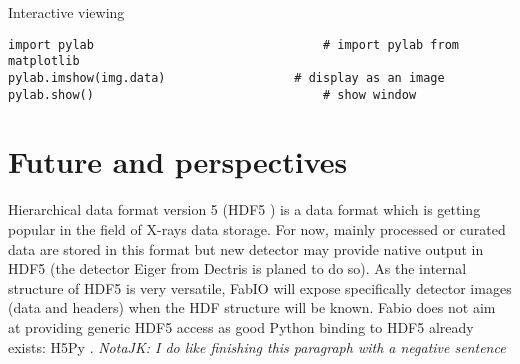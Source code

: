 \documentclass{iucr}
\begin{document}
Interactive viewing

\begin{verbatim}
import pylab								# import pylab from matplotlib
pylab.imshow(img.data)					# display as an image
pylab.show()								# show window
\end{verbatim}





\section{Future and perspectives}

Hierarchical data format version 5 (HDF5 \cite{hdf5}) is a data format which is
getting popular in the field of X-rays data storage. For now, mainly processed
or curated data are stored in this format but new detector may provide native
output in HDF5 (the detector Eiger from Dectris is planed to do so). As the
internal structure of HDF5 is very versatile, FabIO will expose specifically
detector images (data and headers) when the HDF structure will be known.
Fabio does not aim at providing generic HDF5 access as good
Python binding to HDF5 already exists: H5Py \cite{h5py}. 
{\em NotaJK: I do like finishing this paragraph with a negative sentence} 
\end{document}

